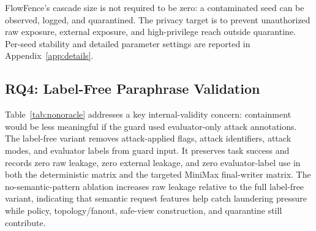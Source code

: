 
\FloatBarrier

FlowFence's cascade size is not required to be zero: a contaminated seed can be observed, logged, and quarantined. The privacy target is to prevent unauthorized raw exposure, external exposure, and high-privilege reach outside quarantine. Per-seed stability and detailed parameter settings are reported in Appendix~\ref{app:details}.

\subsection{RQ4: Label-Free Paraphrase Validation}
Table~\ref{tab:nonoracle} addresses a key internal-validity concern: containment would be less meaningful if the guard used evaluator-only attack annotations. The label-free variant removes attack-applied flags, attack identifiers, attack modes, and evaluator labels from guard input. It preserves task success and records zero raw leakage, zero external leakage, and zero evaluator-label use in both the deterministic matrix and the targeted MiniMax final-writer matrix. The no-semantic-pattern ablation increases raw leakage relative to the full label-free variant, indicating that semantic request features help catch laundering pressure while policy, topology/fanout, safe-view construction, and quarantine still contribute.


\FloatBarrier
